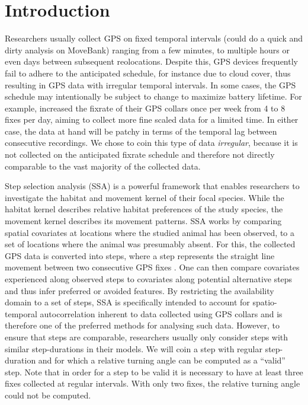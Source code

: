 \documentclass[abstract=on,10pt,a4paper,bibliography=totocnumbered]{article}
\begin{document}
\newpage

\onehalfspacing
\tableofcontents
\doublespacing

\newpage
{}


\section{Introduction}
Researchers usually collect GPS on fixed temporal intervals (could do a quick
and dirty analysis on MoveBank) ranging from a few minutes, to multiple hours or
even days between subsequent reolocations. Despite this, GPS devices frequently
fail to adhere to the anticipated schedule, for instance due to cloud cover,
thus resulting in GPS data with irregular temporal intervals. In some cases, the
GPS schedule may intentionally be subject to change to maximize battery
lifetime. For example, \cite{Cozzi.2020} increased the fixrate of their GPS
collars once per week from 4 to 8 fixes per day, aiming to collect more fine
scaled data for a limited time. In either case, the data at hand will be patchy
in terms of the temporal lag between consecutive recordings. We chose to coin
this type of data \textit{irregular}, because it is not collected on the
anticipated fixrate schedule and therefore not directly comparable to the vast
majority of the collected data.

Step selection analysis (SSA) is a powerful framework that enables researchers
to investigate the habitat and movement kernel of their focal species. While the
habitat kernel describes relative habitat preferences of the study species, the
movement kernel describes its movement patterns. SSA works by comparing spatial
covariates at locations where the studied animal has been observed, to a set of
locations where the animal was presumably absent. For this, the collected GPS
data is converted into steps, where a step represents the straight line movement
between two consecutive GPS fixes \citep{Turchin.1998}. One can then compare
covariates experienced along observed steps to covariates along potential
alternative steps and thus infer preferred or avoided features. By restricting
the availability domain to a set of steps, SSA is specifically intended to
account for spatio-temporal autocorrelation inherent to data collected using GPS
collars and is therefore one of the preferred methods for analysing such data.
However, to ensure that steps are comparable, researchers usually only consider
steps with similar step-durations in their models. We will coin a step with
regular step-duration and for which a relative turning angle can be computed as
a ``valid'' step. Note that in order for a step to be valid it is necessary to
have at least three fixes collected at regular intervals. With only two fixes,
the relative turning angle could not be computed.
\end{document}
